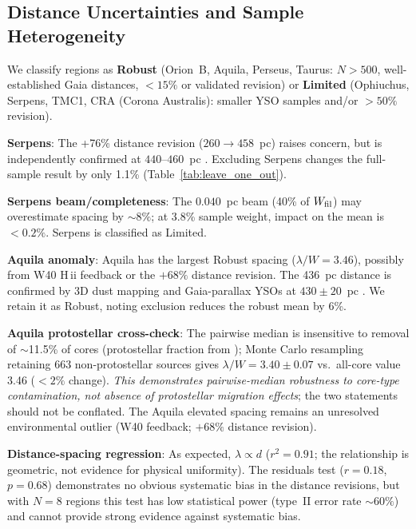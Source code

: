 \documentclass[twoside,twocolumn]{mnras}
\begin{document}
\subsection{Distance Uncertainties and Sample Heterogeneity}
\label{sec:distance_uncertainties}

We classify regions as \textbf{Robust} (Orion~B, Aquila, Perseus, Taurus: $N>500$,
well-established Gaia distances, $<15\%$ or validated revision) or \textbf{Limited}
(Ophiuchus, Serpens, TMC1, CRA (Corona Australis): smaller YSO samples and/or $>50\%$ revision).

\textbf{Serpens}: The +76\% distance revision ($260 \to 458$~pc) raises concern, but is independently confirmed at $440$--$460$~pc \citep{Yan2022, Green2024, Zucker2020}. Excluding Serpens changes the full-sample result by only 1.1\% (Table~\ref{tab:leave_one_out}).

\textbf{Serpens beam/completeness}: The $0.040$~pc beam (40\% of $W_{\rm fil}$) may
overestimate spacing by ${\sim}8\%$; at 3.8\% sample weight, impact on the mean is
$<0.2\%$. Serpens is classified as Limited.

\textbf{Aquila anomaly}: Aquila has the largest Robust spacing ($\lambda/W = 3.46$),
possibly from W40 H\,{\sc ii} feedback \citep{Bontemps2010} or the $+68\%$ distance
revision. The 436~pc distance is confirmed by 3D dust mapping \citep{Zucker2020} and
Gaia-parallax YSOs at $430 \pm 20$~pc \citep{Konyves2020}. We retain it as Robust,
noting exclusion reduces the robust mean by 6\%.

\textbf{Aquila protostellar cross-check}: The pairwise median is insensitive to
removal of $\sim$11.5\% of cores (protostellar fraction from \citealt{Konyves2015});
Monte Carlo resampling retaining 663 non-protostellar sources gives
$\lambda/W = 3.40 \pm 0.07$ vs.\ all-core value 3.46 ($<2\%$ change). \textit{This
demonstrates pairwise-median robustness to core-type contamination, not absence of
protostellar migration effects}; the two statements should not be conflated.
The Aquila elevated spacing remains an unresolved environmental outlier (W40 feedback;
$+68\%$ distance revision).

\textbf{Distance-spacing regression}: As expected, $\lambda \propto d$ ($r^2 = 0.91$;
the relationship is geometric, not evidence for physical uniformity). The residuals
test ($r = 0.18$, $p = 0.68$) demonstrates no obvious systematic bias in the
distance revisions, but with $N = 8$ regions this test has low statistical power
(type~II error rate ${\sim}60\%$) and cannot provide strong evidence against
systematic bias.
\end{document}
